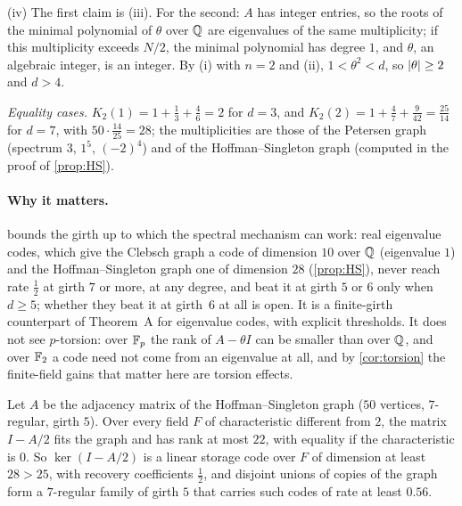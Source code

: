 \begin{informalproof}
(iv) The first claim is (iii). For the second: $A$ has integer entries, so the roots of the minimal polynomial of
$\theta$ over $\mathbb{Q}$ are eigenvalues of the same multiplicity; if this multiplicity exceeds $N/2$, the minimal polynomial
has degree $1$, and $\theta$, an algebraic integer, is an integer. By (i) with $n=2$ and (ii), $1<\theta^2<d$, so
$\lvert \theta \rvert\ge2$ and $d>4$.

\emph{Equality cases.} $K_2(1)=1+\frac13+\frac46=2$ for $d=3$, and $K_2(2)=1+\frac47+\frac9{42}=\frac{25}{14}$ for
$d=7$, with $50\cdot\frac{14}{25}=28$; the multiplicities are those of the Petersen graph (spectrum $3$, $1^5$,
$(-2)^4$) and of the Hoffman--Singleton graph (computed in the proof of \cref{prop:HS}).
\end{informalproof}

\paragraph{Why it matters.}  bounds the girth up to which the spectral mechanism can work: real eigenvalue codes,
which give the Clebsch graph a code of dimension $10$ over $\mathbb{Q}$ (eigenvalue $1$) and the Hoffman--Singleton graph one of
dimension $28$ (\cref{prop:HS}), never reach rate $\frac12$ at girth $7$ or more, at any degree, and beat it at girth $5$
or $6$ only when $d\ge5$; whether they beat it at girth~$6$ at all is open. It is a finite-girth counterpart of
Theorem~A for eigenvalue codes, with explicit thresholds.
It does not see $p$-torsion: over $\mathbb{F}_p$ the rank of $A-\theta I$ can be smaller than over $\mathbb{Q}$, and over $\mathbb{F}_2$ a code
need not come from an eigenvalue at all, and by \cref{cor:torsion} the finite-field gains that matter here are torsion
effects.

\begin{proposition}\label{prop:HS}
\notformalized
Let $A$ be the adjacency matrix of the Hoffman--Singleton graph ($50$ vertices, $7$-regular, girth $5$). Over every field
$F$ of characteristic different from $2$, the matrix $I-A/2$ fits the graph and has rank at most $22$, with equality if
the characteristic is $0$. So $\ker(I-A/2)$ is a linear storage code over $F$ of dimension at least $28>25$, with
recovery coefficients $\frac12$, and disjoint unions of copies of the graph form a $7$-regular family of girth $5$ that
carries such codes of rate at least $0.56$.
\end{proposition}

